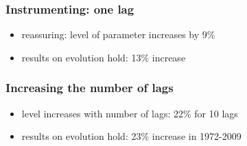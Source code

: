 \documentclass{beamer}
\begin{document}
\begin{frame}[plain]\frametitle{Instrumenting: one lag}
\begin{figure}[h!]
\begin{center}
\setlength{\fboxrule}{1pt} %
\setlength{\fboxsep}{.1in} %
\end{center}
\end{figure}
\begin{itemize}
\item reassuring: level of parameter increases by 9\%
\item results on evolution hold: 13\% increase
\end{itemize}
\end{frame}

\begin{frame}[plain]\frametitle{Increasing the number of lags}
\begin{figure}[h!]
\begin{center}
\setlength{\fboxrule}{1pt} %
\setlength{\fboxsep}{.1in} %
\end{center}
\end{figure}
\begin{itemize}
\item level increases with number of lags: 22\% for 10 lags
\item results on evolution hold: 23\% increase in 1972-2009 
\end{itemize}
\end{frame}
\end{document}
